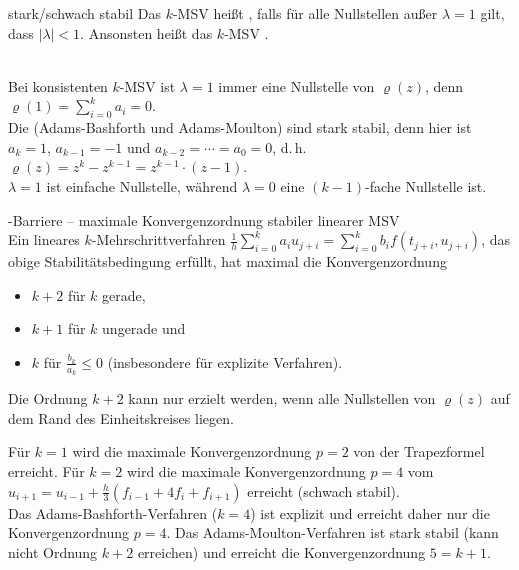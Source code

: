 \begin{Def}{stark/schwach stabil}
    Das $k$-MSV heißt , falls
    für alle Nullstellen außer $\lambda = 1$ gilt, dass $|\lambda| < 1$.
    Ansonsten heißt das $k$-MSV .
\end{Def}

\begin{Bem}\\
    Bei konsistenten $k$-MSV ist $\lambda = 1$ immer eine Nullstelle von
    $\varrho(z)$, denn
    $\varrho(1) = \sum_{i=0}^k a_i = 0$.\\
    Die 
    (Adams-Bashforth und Adams-Moulton) sind stark stabil,
    denn hier ist $a_k = 1$, $a_{k-1} = -1$ und
    $a_{k-2} = \dotsb = a_0 = 0$, d.\,h.
    $\varrho(z) = z^k - z^{k-1} = z^{k-1} \cdot (z - 1)$.\\
    $\lambda = 1$ ist einfache Nullstelle, während
    $\lambda = 0$ eine $(k - 1)$-fache Nullstelle ist.
\end{Bem}

\linie

\begin{Satz}{-Barriere -- maximale Konvergenzordnung
             stabiler linearer MSV}\\
    Ein lineares $k$-Mehrschrittverfahren
    $\frac{1}{h} \sum_{i=0}^k a_i u_{j+i} =
    \sum_{i=0}^k b_i f(t_{j+i}, u_{j+i})$, das obige
    Stabilitätsbedingung erfüllt, hat maximal die Konvergenzordnung
    \begin{itemize}
        \item
        $k + 2$ für $k$ gerade,
        
        \item
        $k + 1$ für $k$ ungerade und
        
        \item
        $k$ für $\frac{b_k}{a_k} \le 0$ (insbesondere für explizite Verfahren).
    \end{itemize}
    Die Ordnung $k + 2$ kann nur erzielt werden, wenn alle Nullstellen von
    $\varrho(z)$ auf dem Rand des Einheitskreises liegen.
\end{Satz}

\begin{Bsp}
    Für $k = 1$ wird die maximale Konvergenzordnung $p = 2$ von
    der Trapezformel erreicht.
    Für $k = 2$ wird die maximale Konvergenzordnung $p = 4$ vom
    $u_{i+1} = u_{i-1} + \frac{h}{3} (f_{i-1} + 4 f_i + f_{i+1})$
    erreicht (schwach stabil).\\
    Das Adams-Bashforth-Verfahren ($k = 4$) ist explizit und erreicht daher
    nur die Konvergenzordnung $p = 4$.
    Das Adams-Moulton-Verfahren ist stark stabil (kann nicht Ordnung $k + 2$
    erreichen) und erreicht die Konvergenzordnung $5 = k + 1$.
\end{Bsp}


